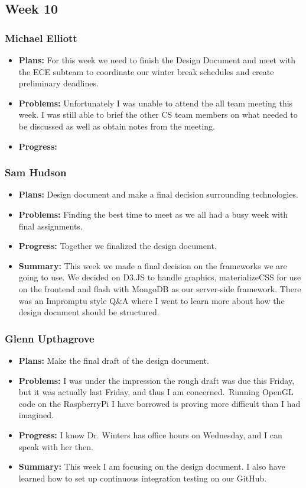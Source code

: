 \documentclass[onecolumn, draftclsnofoot,10pt, compsoc]{IEEEtran}
\begin{document}
\subsection {Week 10}
\subsubsection{Michael Elliott}
\begin {itemize}
\item \textbf{Plans: }
  For this week we need to finish the Design Document and meet with the ECE subteam to coordinate our winter break schedules and create preliminary deadlines.
\item \textbf{Problems: }
  Unfortunately I was unable to attend the all team meeting this week. I was still able to brief the other CS team members on what needed to be discussed as well as obtain notes from the meeting.
\item \textbf{Progress: }
  
\end {itemize}
\subsubsection{Sam Hudson}
\begin {itemize}
\item \textbf{Plans: }Design document and make a final decision surrounding technologies.
\item \textbf{Problems: }Finding the best time to meet as we all had a busy week with final assignments.
\item \textbf{Progress: }Together we finalized the design document.
\item \textbf{Summary: }This week we made a final decision on the frameworks we are going to use. We decided on D3.JS to handle graphics, materializeCSS for use on the frontend and flash with MongoDB as our server-side framework. There was an Impromptu style Q\&A where I went to learn more about how the design document should be structured. 
\end {itemize}
\subsubsection{Glenn Upthagrove}
\begin {itemize}
 \item \textbf{Plans: }Make the final draft of the design document. 
 \item \textbf{Problems: }I was under the impression the rough draft was due this Friday, but it was actually last Friday, and thus I am concerned. Running OpenGL code on the RaspberryPi I have borrowed is proving more difficult than I had imagined.
 \item \textbf{Progress: }I know Dr. Winters has office hours on Wednesday, and I can speak with her then.
 \item \textbf{Summary: }This week I am focusing on the design document. I also have learned how to set up continuous integration testing on our GitHub.
\end {itemize}


%
%
\end{document}
